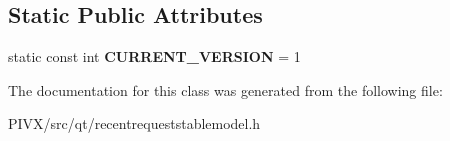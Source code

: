 \subsection*{Static Public Attributes}
\begin{DoxyCompactItemize}
\item 
\mbox{\label{class_recent_request_entry_a1913e689444379d7a526e1680f7a1017}} 
static const int {\bfseries C\+U\+R\+R\+E\+N\+T\+\_\+\+V\+E\+R\+S\+I\+ON} = 1
\end{DoxyCompactItemize}


The documentation for this class was generated from the following file\+:\begin{DoxyCompactItemize}
\item 
P\+I\+V\+X/src/qt/recentrequeststablemodel.\+h\end{DoxyCompactItemize}
